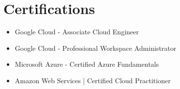 \documentclass[letterpaper,11pt]{article}
\newcommand{\resumeItem}[1]{
  \item\small{
    {#1 \vspace{-2pt}}
  }
}
\newcommand{\resumeSubHeadingListEnd}{\end{itemize}}
\newcommand{\resumeItemListStart}{\begin{itemize}}
\begin{document}
\section{Certifications}

\resumeItemListStart
        \resumeItem{Google Cloud - Associate Cloud Engineer}
        \resumeItem{Google Cloud - Professional Workspace Administrator}
        \resumeItem{Microsoft Azure - Certified Azure Fundamentals}
        \resumeItem{Amazon Web Services | Certified Cloud Practitioner}
 \resumeSubHeadingListEnd
 
\end{document}
